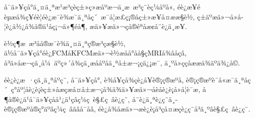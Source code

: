 \documentclass[lang=cn,11pt]{elegantpaper}
\begin{document}
å¯ä»¥çå°ä¸¤ä¸ªæ¹æ³çèç±»ç»æåºæ¬ä¸æ æ³ç¨èç¼åºå«, éè¿æ¥éèµæå¾ç¥éè¦éè¿æ¯è¾æ¯ä¸ªåç´ æ¯å¦æ­£ç¡®åç±»æ¥å¤æ­æ§è½, ç±äºæä»¬å»å­¦è¿ä½¿å¾å®ä¹åç¡¬ä»¶éå¶, æä»¥æä»¬çå®éªåæ­¢å¨è¿ä¸æ­¥. 

è½ç¶æ æ³åå®æ¯è¾ä¸¤ä¸ªç®æ³çæ§è½, ä½å¯ä»¥çå°éè¿FCMåKFCMæä»¬è½æåå°åå§çMRIå¾âåçâ, å³ä»åæ¬çä¸å¼ äºç»´å¾çä¸­æååºå­ä¸ªå±æ¬¡çä¿¡æ¯, ä¸ºå»ççåææä¾äºä¾¿å©. 

éè¿è¿æ ·çä¸ä¸ªåºç¨, å¯ä»¥çå°, è¾å¥çå¾çè¿å¥è®¡ç®æºå, è®¡ç®æºè¯å«æ¯ä¸ªåç´ ç°åº¦åè¿è¡èç±»åæçæå¤å±æ¬¡å¾ä¾ä»¥æä»¬åèåè¿è¡å»å­¦è¯æ­, å¶å®è¿ä¹å¯ä»¥çåå¹¿ä¹çâç¼ç è§£ç âè¿ç¨, å¨è¿ä¸ªè¿ç¨ä¸­è®¡ç®æºå®ç°äºâç¼ç âãâå¨å­â, éè¿å¾åæä»¬æè¿è¡å³ç­å¤æ­çè¿ç¨å³ä¸ºâè§£ç âè¿ç¨. 


\newpage
\nocite{*}



\end{document}
